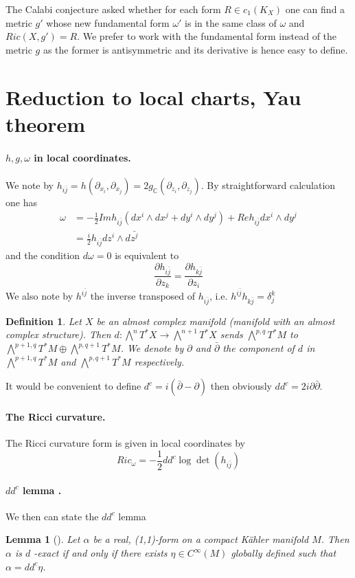 \documentclass[11pt]{article}
\newtheorem{lemma}[theorem]{Lemma}
\newtheorem{definition}{Definition}
\begin{document}
The Calabi conjecture asked whether for each form \(R\in c_1(K_X)\) one can find a metric \(g'\) whose
new fundamental form \(\omega'\) is in the same class of \(\omega\) and \(Ric(X,g') = R\). We prefer to
work with the fundamental form instead of the metric \(g\) as the former is antisymmetric and its
derivative is hence easy to define.

\section{Reduction to local charts, Yau theorem}
\label{sec:orgec41f20}
\paragraph{\(h,g,\omega\) in local coordinates.}
\label{sec:orga12bb61}
We note by \(h_{i\bar j} = h(\partial_{x_i},\partial_{x_j}) =
2g_{\mathbb{C}}(\partial_{z_i},\partial_{z_j})\). By straightforward calculation one has
\begin{align*}
\omega & = -\frac{1}{2} Im h_{i\bar j} (dx^i\wedge dx^j + dy^i\wedge dy^j) + Re h_{i\bar j}dx^i\wedge dy^j\\
& = \frac{i}{2}h_{i\bar j}dz^i\wedge d\bar{z^j}
\end{align*}
and the condition \(d\omega = 0\) is equivalent to
\[
\frac{\partial h_{i\bar j}}{\partial z_k} = \frac{\partial h_{k\bar j}}{\partial z_i}
\]
We also note by \(h^{i\bar j}\) the inverse transposed of \(h_{i\bar j}\), i.e. \(h^{i\bar j}h_{k\bar j}
= \delta_j^k\)
\begin{definition}
Let \(X\) be an almost complex manifold (manifold with an almost complex structure). Then
\(d:\bigwedge^nT^*X\longrightarrow \bigwedge^{n+1}T^*X\) sends \(\bigwedge^{p,q}T^*M\) to
\(\bigwedge^{p+1,q}T^*M\oplus \bigwedge^{p,q+1}T^*M\). We denote by \(\partial\) and \(\bar\partial\) the
component of \(d\) in \(\bigwedge^{p+1,q}T^*M\) and \(\bigwedge^{p,q+1}T^*M\) respectively. 
\end{definition}
It would be convenient to define \(d^c =i(\bar\partial - \partial)\) then obviously \(dd^c =
2i\partial\bar\partial\). 


\paragraph{The Ricci curvature.}
\label{sec:org38fe6b4}
The Ricci curvature form is given in local coordinates by
\[
Ric_{\omega} = -\frac{1}{2}dd^c\log\det(h_{i\bar j})
\]


\paragraph{\(dd^c\) lemma .}
\label{sec:org77ef14c}
We then can state the \(dd^c\) lemma
\begin{lemma}[]
Let \(\alpha\) be a real, (1,1)-form on a compact Kähler manifold \(M\). Then \(\alpha\) is \(d\) -exact if
and only if there exists \(\eta\in C^\infty(M)\) globally defined such that \(\alpha = dd^c\eta\).
\end{lemma}
\end{document}
